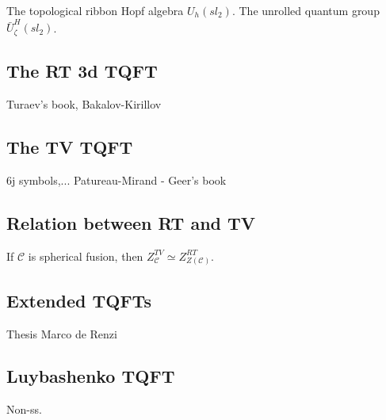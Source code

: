 \documentclass{article}
\begin{document}
The topological ribbon Hopf algebra $U_h(sl_2)$. The unrolled quantum group $\bar{U}^H_\zeta(sl_2)$.


\subsection{The RT 3d TQFT}

Turaev's book, Bakalov-Kirillov


\subsection{The TV TQFT}

6j symbols,... Patureau-Mirand - Geer's book


\subsection{Relation between RT and TV}

If $\mathcal{C}$ is spherical fusion, then $Z^{TV}_{\mathcal{C}} \simeq Z^{RT}_{Z(\mathcal{C})}$.


\subsection{Extended TQFTs}

Thesis Marco de Renzi




\subsection{Luybashenko TQFT}

Non-ss. 
\end{document}
